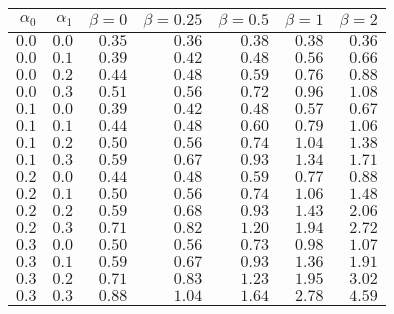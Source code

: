 \begin{tabular}{rr|rrrrr}
\hline\hline
 $\alpha_0$ & $\alpha_1$ & $\beta=0$ & $\beta=0.25$ & $\beta=0.5$ & $\beta=1$ & $\beta=2$ \\ 
 \hline
$0.0$ & $0.0$ & $0.35$ & $0.36$ & $0.38$ & $0.38$ & $0.36$\\ 
$0.0$ & $0.1$ & $0.39$ & $0.42$ & $0.48$ & $0.56$ & $0.66$\\ 
$0.0$ & $0.2$ & $0.44$ & $0.48$ & $0.59$ & $0.76$ & $0.88$\\ 
$0.0$ & $0.3$ & $0.51$ & $0.56$ & $0.72$ & $0.96$ & $1.08$\\ 
$0.1$ & $0.0$ & $0.39$ & $0.42$ & $0.48$ & $0.57$ & $0.67$\\ 
$0.1$ & $0.1$ & $0.44$ & $0.48$ & $0.60$ & $0.79$ & $1.06$\\ 
$0.1$ & $0.2$ & $0.50$ & $0.56$ & $0.74$ & $1.04$ & $1.38$\\ 
$0.1$ & $0.3$ & $0.59$ & $0.67$ & $0.93$ & $1.34$ & $1.71$\\ 
$0.2$ & $0.0$ & $0.44$ & $0.48$ & $0.59$ & $0.77$ & $0.88$\\ 
$0.2$ & $0.1$ & $0.50$ & $0.56$ & $0.74$ & $1.06$ & $1.48$\\ 
$0.2$ & $0.2$ & $0.59$ & $0.68$ & $0.93$ & $1.43$ & $2.06$\\ 
$0.2$ & $0.3$ & $0.71$ & $0.82$ & $1.20$ & $1.94$ & $2.72$\\ 
$0.3$ & $0.0$ & $0.50$ & $0.56$ & $0.73$ & $0.98$ & $1.07$\\ 
$0.3$ & $0.1$ & $0.59$ & $0.67$ & $0.93$ & $1.36$ & $1.91$\\ 
$0.3$ & $0.2$ & $0.71$ & $0.83$ & $1.23$ & $1.95$ & $3.02$\\ 
$0.3$ & $0.3$ & $0.88$ & $1.04$ & $1.64$ & $2.78$ & $4.59$\\ 
 \hline 
 \end{tabular}